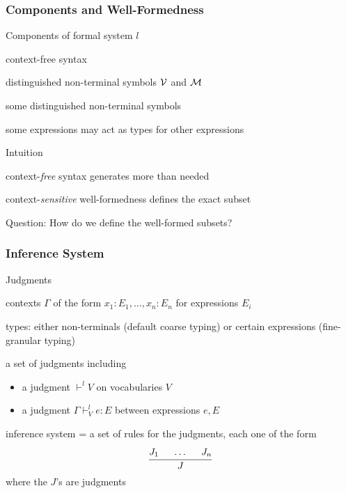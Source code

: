
\begin{frame}\frametitle{Components and Well-Formedness}
\begin{blockitems}{Components of formal system $l$}
 \item context-free syntax
 \item distinguished non-terminal symbols $\mathcal{V}$ and $\mathcal{M}$ 
 \item some distinguished non-terminal symbols 
 \item some expressions may act as types for other expressions
\end{blockitems}

\begin{blockitems}{Intuition}
\item context-\emph{free} syntax generates more than needed
\item context-\emph{sensitive} well-formedness defines the exact subset
\end{blockitems}

Question: How do we define the well-formed subsets?
\end{frame}

\begin{frame}\frametitle{Inference System}
\begin{blockitems}{Judgments}
\item contexts $\Gamma$ of the form $x_1:E_1,\ldots,x_n:E_n$ for expressions $E_i$
\item types: either non-terminals (default coarse typing) or certain expressions (fine-granular typing)
\item a set of judgments including
 \begin{itemize}
  \item a judgment $\vdash^l V$ on vocabularies $V$
  \item a judgment $\Gamma\vdash^l_V e:E$ between expressions $e,E$
 \end{itemize}
\item inference system = a set of rules for the judgments, each one of the form
\[\cfrac{J_1 \hspace*{.5cm} \ldots \hspace*{.5cm} J_n}{J}\,\]
where the $J$'s are judgments
\end{blockitems}
\end{frame}

